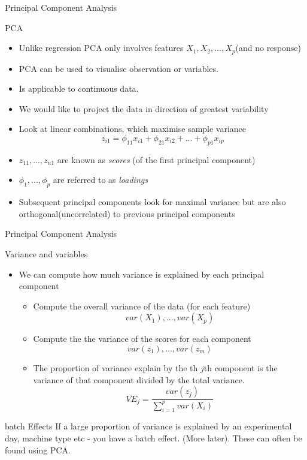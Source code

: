 \documentclass{bredelebeamer}
\begin{document}
\begin{frame}{Principal Component Analysis}
\begin{exampleblock}{PCA}
\begin{itemize}
\item Unlike regression PCA only involves features $X_1,X_2,...,X_p$(and no response)
\item PCA can be used to visualise observation or variables.
\item Is applicable to continuous data.
\item We would like to project the data in direction of greatest variability
\item Look at linear combinations, which maximise sample variance
\begin{equation}
z_{i1} = \phi_{11}x_{i1} + \phi_{21}x_{i2} + ... + \phi_{p1} x_{ip}
\end{equation}
\item $z_{11},...,z_{n1}$ are known as \textit{scores} (of the first principal component)
\item $\phi_1,..., \phi_p$ are referred to as \textit{loadings}
\item Subsequent principal components look for maximal variance but are also orthogonal(uncorrelated) to previous principal components
\end{itemize}
\end{exampleblock}
\end{frame}
\begin{frame}{Principal Component Analysis}
\begin{exampleblock}{Variance and variables}
	\begin{itemize}
	\item We can compute how much variance is explained by each principal component
	\begin{itemize}
	\item Compute the overall variance of the data (for each feature)
	\begin{equation}
	var(X_1),..., var(X_p)
	\end{equation}
	\item Compute the the variance of the scores for each component
	\begin{equation}
	var(z_1),..., var(z_m)
	\end{equation}
	\item The proportion of variance explain by the th $j$th component is the variance of that component divided by the total variance.
	\begin{equation}
	VE_j = \frac{var(z_j)}{\sum_{i =1}^{p} var(X_i)}
	\end{equation}
	\end{itemize}
	\end{itemize}
\end{exampleblock}

\begin{alertblock}{batch Effects}
If a large proportion of variance is explained by an experimental day, machine type etc - you have a batch effect. (More later). These can often be found using PCA.
\end{alertblock}

\end{frame}
\end{document}
